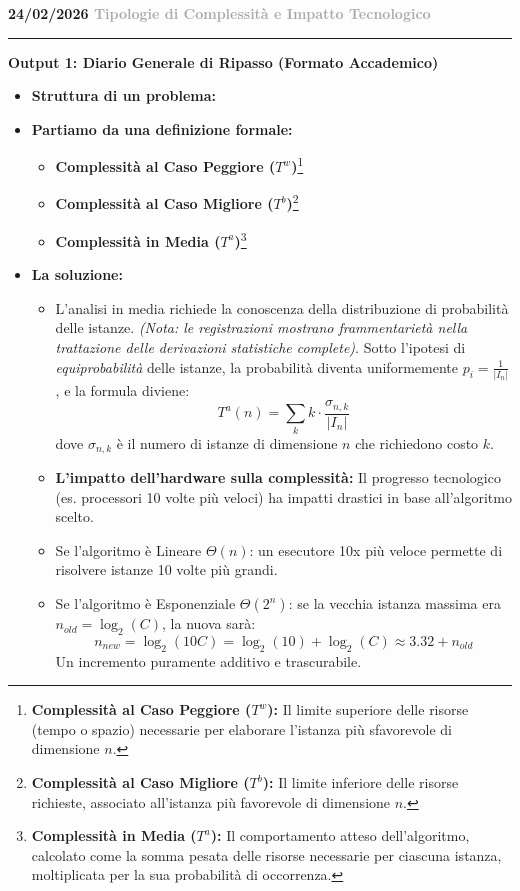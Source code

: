 \documentclass[a4paper, 11pt]{report}
\newcommand{\lezione}[2]{
\vspace{2em}
\noindent\textbf{\Large #1 \hfill \textcolor{darkgray}{#2}}
\vspace{0.5em}
\hrule
\vspace{1.5em}
}
\newcommand{\definizione}[2]{%
\textbf{#1}\footnote{\textbf{#1:} #2}%
}
\begin{document}
\lezione{24/02/2026}{Tipologie di Complessità e Impatto Tecnologico}
\vspace{0.5cm}
\textbf{Output 1: Diario Generale di Ripasso (Formato Accademico)}
\begin{itemize}
\item \textbf{Struttura di un problema:}
\item \textbf{Partiamo da una definizione formale:}
\begin{itemize}
\item \definizione{Complessità al Caso Peggiore ($T^w$)}{Il limite superiore delle risorse (tempo o spazio) necessarie per elaborare l'istanza più sfavorevole di dimensione $n$.}
\item \definizione{Complessità al Caso Migliore ($T^b$)}{Il limite inferiore delle risorse richieste, associato all'istanza più favorevole di dimensione $n$.}
\item \definizione{Complessità in Media ($T^a$)}{Il comportamento atteso dell'algoritmo, calcolato come la somma pesata delle risorse necessarie per ciascuna istanza, moltiplicata per la sua probabilità di occorrenza.}
\end{itemize}
\item \textbf{La soluzione:}
\begin{itemize}
\item L'analisi in media richiede la conoscenza della distribuzione di probabilità delle istanze. \textit{(Nota: le registrazioni mostrano frammentarietà nella trattazione delle derivazioni statistiche complete)}. Sotto l'ipotesi di \textit{equiprobabilità} delle istanze, la probabilità diventa uniformemente $p_i = \frac{1}{|I_n|}$, e la formula diviene:
\[ T^a(n) = \sum_{k} k \cdot \frac{\sigma_{n,k}}{|I_n|} \]
dove $\sigma_{n,k}$ è il numero di istanze di dimensione $n$ che richiedono costo $k$.
\item \textbf{L'impatto dell'hardware sulla complessità:} Il progresso tecnologico (es. processori 10 volte più veloci) ha impatti drastici in base all'algoritmo scelto.
\item Se l'algoritmo è Lineare $\Theta(n)$: un esecutore 10x più veloce permette di risolvere istanze 10 volte più grandi.
\item Se l'algoritmo è Esponenziale $\Theta(2^n)$: se la vecchia istanza massima era $n_{old} = \log_2(C)$, la nuova sarà:
\begin{equation*}
n_{new} = \log_2(10C) = \log_2(10) + \log_2(C) \approx 3.32 + n_{old}
\end{equation*}
Un incremento puramente additivo e trascurabile.
\end{itemize}
\end{itemize}
\end{document}
